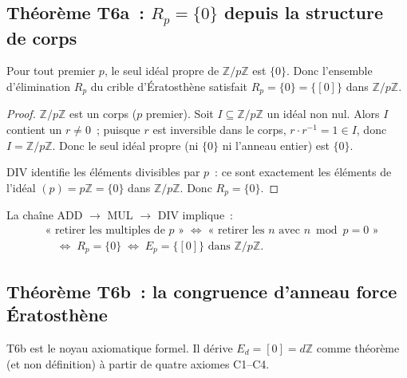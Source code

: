 \documentclass[12pt,a4paper]{article}
\begin{document}
\subsection{Théorème T6a~: $R_p = \{0\}$ depuis la structure de corps}
\label{sec:T6_restricted}

\mTHM
\begin{theoreme}
\label{thm:T6_restricted}
Pour tout premier $p$, le seul idéal propre de
$\mathbb{Z}/p\mathbb{Z}$ est $\{0\}$. Donc l'ensemble d'élimination
$R_p$ du crible d'Ératosthène satisfait $R_p = \{0\} = \{[0]\}$ dans
$\mathbb{Z}/p\mathbb{Z}$.

\begin{proof}
$\mathbb{Z}/p\mathbb{Z}$ est un corps ($p$ premier). Soit
$I \subseteq \mathbb{Z}/p\mathbb{Z}$ un idéal non nul. Alors $I$
contient un $r \neq 0$~; puisque $r$ est inversible dans le corps,
$r \cdot r^{-1} = 1 \in I$, donc $I = \mathbb{Z}/p\mathbb{Z}$. Donc
le seul idéal propre (ni $\{0\}$ ni l'anneau entier) est $\{0\}$.

DIV identifie les éléments divisibles par $p$~: ce sont exactement
les éléments de l'idéal $(p) = p\mathbb{Z} = \{0\}$ dans
$\mathbb{Z}/p\mathbb{Z}$. Donc $R_p = \{0\}$.
\end{proof}
\end{theoreme}

\begin{corollaire}
La chaîne ADD $\to$ MUL $\to$ DIV implique~:
\begin{align*}
  &\text{«~retirer les multiples de } p\text{~»} \;\iff\;
  \text{«~retirer les } n \text{ avec } n \bmod p = 0\text{~»} \\
  &\quad\iff\; R_p = \{0\} \;\iff\; E_p = \{[0]\} \text{ dans } \mathbb{Z}/p\mathbb{Z}.
\end{align*}
\end{corollaire}

\subsection{Théorème T6b~: la congruence d'anneau force Ératosthène}
\label{sec:T6_universal}

T6b est le noyau axiomatique formel. Il dérive
$E_d = [0] = d\mathbb{Z}$ comme théorème (et non définition) à partir
de quatre axiomes C1--C4.
\end{document}

